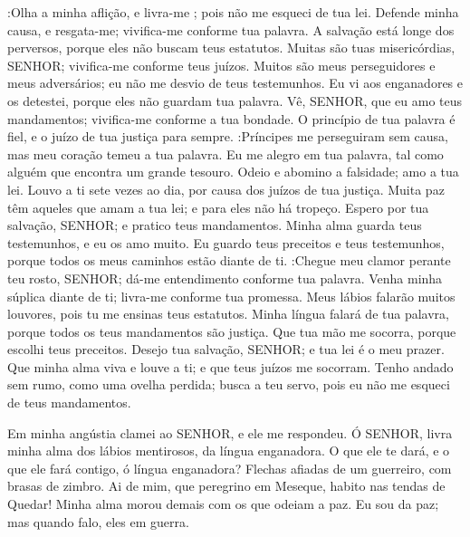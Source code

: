 {   :Olha a minha aflição, e livra-me
{} ; pois não me esqueci de tua lei.
  Defende minha causa, e resgata-me; vivifica-me conforme tua palavra.
  A salvação está longe dos perversos, porque eles não buscam teus estatutos.
  Muitas são tuas misericórdias, SENHOR; vivifica-me conforme teus juízos.
  Muitos são meus perseguidores e meus adversários;
{} eu não me desvio de teus testemunhos.
  Eu vi aos enganadores e os detestei, porque eles não guardam tua palavra.
  Vê, SENHOR, que eu amo teus mandamentos; vivifica-me conforme a tua bondade.
  O princípio de tua palavra é fiel, e o juízo de tua justiça
{} para sempre.
   :Príncipes me perseguiram sem causa, mas meu coração temeu a tua palavra.
  Eu me alegro em tua palavra, tal como alguém que encontra um grande tesouro.
  Odeio e abomino a falsidade;
{} amo a tua lei.
  Louvo a ti sete vezes ao dia, por causa dos juízos de tua justiça.
  Muita paz têm aqueles que amam a tua lei; e para eles não há tropeço.
  Espero por tua salvação, SENHOR; e pratico teus mandamentos.
  Minha alma guarda teus testemunhos, e eu os amo muito.
  Eu guardo teus preceitos e teus testemunhos, porque todos os meus caminhos estão diante de ti.
   :Chegue meu clamor perante teu rosto, SENHOR; dá-me entendimento conforme tua palavra.
  Venha minha súplica diante de ti; livra-me conforme tua promessa.
  Meus lábios falarão muitos louvores, pois tu me ensinas teus estatutos.
  Minha língua falará de tua palavra, porque todos os teus mandamentos são justiça.
  Que tua mão me socorra, porque escolhi
{} teus preceitos.
  Desejo tua salvação, SENHOR; e tua lei é o meu prazer.
  Que minha alma viva e louve a ti; e que teus juízos me socorram.
  Tenho andado sem rumo, como uma ovelha perdida; busca a teu servo, pois eu não me esqueci de teus mandamentos.
\par }


{\PP 
  Em minha angústia clamei ao SENHOR, e ele me respondeu.
  Ó SENHOR, livra minha alma dos lábios mentirosos, da língua enganadora.
  O que ele te dará, e o que ele fará contigo, ó língua enganadora?
  Flechas afiadas de um guerreiro, com brasas de zimbro.
  Ai de mim, que peregrino em Meseque,
{} habito nas tendas de Quedar!
  Minha alma morou
{} demais com os que odeiam a paz.
  Eu sou da paz; mas quando falo, eles
{} em guerra.
\par }

